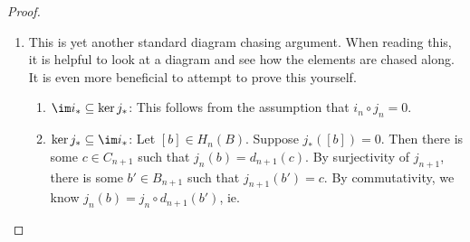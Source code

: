 \documentclass[a4paper]{article}
\begin{document}
\begin{proof}
\begin{enumerate}
\begin{enumerate}
\begin{align*}
            &= i_{n - 1} \circ d_n (a) + d_n(y).
          \end{align*}
          Hence when we pull back $d_n(y')$ and $d_n(y)$ to $A_{n - 1}$, the results differ by the boundary $d_n(a)$, and hence produce the same homology class.
        \item Suppose $[x'] = [x]$. We want to show that $\partial_* [x] = \partial_*[x']$. This time, we add a layer above.
          \[
            \begin{tikzcd}
              0 \ar[r] & A_{n + 1} \ar[r, "i_{n + 1}"] \ar[d, "d_{n + 1}"] & B_{n + 1} \ar[r, "j_{n + 1}"] \ar[d, "d_{n + 1}"] & C_{n + 1} \ar[r] \ar[d, "d_{n + 1}"] & 0\\
              0 \ar[r] & A_n \ar[r, "i_n"] \ar[d, "d_n"] & B_n \ar[r, "j_n"] \ar[d, "d_n"] & C_n \ar[r] \ar[d, "d_n"] & 0\\
              0 \ar[r] & A_{n - 1} \ar[r, "i_{n - 1}"] & B_{n - 1} \ar[r, "j_{n - 1}"] & C_{n - 1} \ar[r] & 0
            \end{tikzcd}
          \]
          By definition, since $[x'] = [x]$, there is some $c \in C_{n + 1}$ such that
          \[
            x' = x + d_{n + 1} (c).
          \]
          By surjectivity of $j_{n + 1}$, we can write $c = j_{n + 1}(b)$ for some $b \in B_{n + 1}$. By commutativity of the squares, we know
          \[
            x' = x + j_n \circ d_{n + 1} (b).
          \]
          The next step of the proof is to find some $y$ such that $j_n (y) = x$. Then
          \[
            j_n(y + d_{n + 1} (b)) = x'.
          \]
          So the corresponding $y'$ is $y' = y + d_{n + 1}(b)$. So $d_n (y) = d_n(y')$, and hence $\partial_*[x] = \partial_* [x']$.
      \end{enumerate}
    \item This is yet another standard diagram chasing argument. When reading this, it is helpful to look at a diagram and see how the elements are chased along. It is even more beneficial to attempt to prove this yourself.
      \begin{enumerate}
        \item $\im i_* \subseteq \ker j_*$: This follows from the assumption that $i_n \circ j_n = 0$.
        \item $\ker j_* \subseteq \im i_*$: Let $[b] \in H_n(B)$. Suppose $j_*([b]) = 0$. Then there is some $c \in C_{n + 1}$ such that $j_n(b) = d_{n + 1}(c)$. By surjectivity of $j_{n + 1}$, there is some $b' \in B_{n + 1}$ such that $j_{n + 1}(b') = c$. By commutativity, we know $j_n(b) = j_n \circ d_{n + 1}(b')$, ie.

\end{enumerate}
\end{enumerate}
\end{proof}
\end{document}

